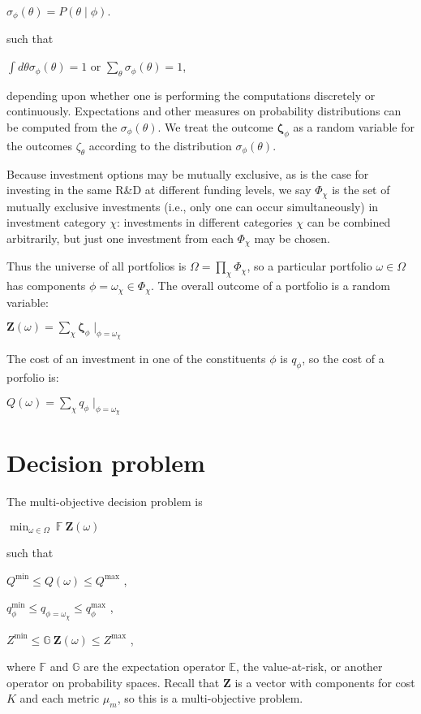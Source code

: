 \documentclass[letterpaper,10pt,english]{sphinxmanual}
\begin{document}
\(\sigma_\phi(\theta) = P\left(\theta \middle| \phi\right)\).

such that

\(\int d\theta \sigma_\phi(\theta) = 1\) or
\(\sum_\theta \sigma_\phi(\theta) = 1\),

depending upon whether one is performing the computations discretely or
continuously. Expectations and other measures on probability
distributions can be computed from the \(\sigma_\phi(\theta)\). We
treat the outcome \(\mathbf{\zeta}_\phi\) as a random variable for
the outcomes \(\zeta_\theta\) according to the distribution
\(\sigma_\phi(\theta)\).

Because investment options may be mutually exclusive, as is the case for
investing in the same R\&D at different funding levels, we say
\(\Phi_\chi\) is the set of mutually exclusive investments (i.e.,
only one can occur simultaneously) in investment category \(\chi\):
investments in different categories \(\chi\) can be combined
arbitrarily, but just one investment from each \(\Phi_\chi\) may be
chosen.

Thus the universe of all portfolios is
\(\Omega = \prod_\chi \Phi_\chi\), so a particular portfolio
\(\omega \in \Omega\) has components
\(\phi = \omega_\chi \in \Phi_\chi\). The overall outcome of a
portfolio is a random variable:

\(\mathbf{Z}(\omega) = \sum_\chi \mathbf{\zeta}_\phi \mid_{\phi = \omega_\chi}\)

The cost of an investment in one of the constituents \(\phi\) is
\(q_\phi\), so the cost of a porfolio is:

\(Q(\omega) = \sum_\chi q_\phi \mid_{\phi = \omega_\chi}\)


\section{Decision problem}
\label{\detokenize{doc-src/formulation:decision-problem}}
The multi-objective decision problem is

\(\min_{\omega \in \Omega} \  \mathbb{F} \  \mathbf{Z}(\omega)\)

such that

\(Q^\mathrm{min} \leq Q(\omega) \leq Q^\mathrm{max}\) ,

\(q^\mathrm{min}_\phi \leq q_{\phi=\omega_\chi} \leq q^\mathrm{max}_\phi\)
,

\(Z^\mathrm{min} \leq \mathbb{G} \  \mathbf{Z}(\omega) \leq Z^\mathrm{max}\)
,

where \(\mathbb{F}\) and \(\mathbb{G}\) are the expectation
operator \(\mathbb{E}\), the value-at-risk, or another operator on
probability spaces. Recall that \(\mathbf{Z}\) is a vector with
components for cost \(K\) and each metric \(\mu_m\), so this is
a multi-objective problem.
\end{document}
